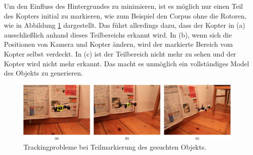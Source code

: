 	Um den Einfluss des Hintergrundes zu minimieren, ist es möglich nur einen Teil des Kopters initial zu markieren, wie zum Beispiel den Corpus ohne die Rotoren, wie in Abbildung \ref{abb:problem_background_2} dargestellt. Das führt allerdings dazu, dass der Kopter in (a) ausschließlich anhand dieses Teilbereichs erkannt wird. In (b), wenn sich die Positionen von Kamera und Kopter ändern, wird der markierte Bereich vom Kopter selbst verdeckt. In (c) ist der Teilbereich nicht mehr zu sehen und der Kopter wird nicht mehr erkannt. Das macht es unmöglich ein vollständiges Model des Objekts zu generieren.

	\begin{figure}[H]
		\begin{centering}
			\includegraphics[scale=0.5]{../pictures/problem_background_2.jpg}
			\caption{Trackingprobleme bei Teilmarkierung des gesuchten Objekts.}
			\label{abb:problem_background_2}
			\par
		\end{centering}
	\end{figure}




